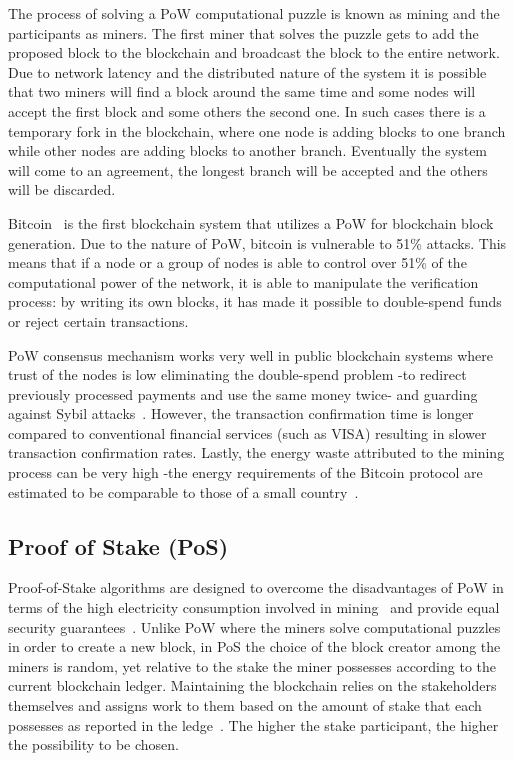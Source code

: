 The process of solving a PoW computational puzzle is known as mining and the participants as miners.
The first miner that solves the puzzle gets to add the proposed block to the blockchain and broadcast
the block to the entire network. Due to network latency and the distributed nature of the system it is possible that two miners will
find a block around the same time and some nodes will accept the first block and some others the second one. In such cases there is a temporary
fork in the blockchain, where one node is adding blocks to one branch while other nodes are adding blocks to another branch. Eventually the
system will come to an agreement, the longest branch will be accepted and the others will be discarded.

Bitcoin~\cite{Zohar:2015:BUH:2817191.2701411} is the first blockchain system that utilizes a PoW for blockchain block generation. Due to the nature of PoW, bitcoin is vulnerable to 51\% attacks.
This means that if a node or a group of nodes is able to control over 51\% of the computational power of the network, it is able to manipulate
the verification process: by writing its own blocks, it has made it possible to double-spend funds or reject certain transactions.

PoW consensus mechanism works very well in public blockchain systems where trust of the nodes is low eliminating
the double-spend problem -to redirect previously processed payments and use the same money twice- and guarding against Sybil attacks~\cite{Vu:2009:PCP:1671222}.
However, the transaction confirmation time is longer compared to conventional financial services (such as VISA)\cite{Sompolinsky2015,Zohar:2015:BUH:2817191.2701411,DBLP:journals/corr/abs-1708-05665} resulting
in slower transaction confirmation rates. Lastly, the energy waste attributed to the mining process can be very high -the energy requirements
of the Bitcoin protocol are estimated to be comparable to those of a small country~\cite{6912770}.

\subsection{Proof of Stake (PoS)}\label{blockchain:consensus:pos}

Proof-of-Stake algorithms are designed to overcome the disadvantages of PoW in terms of the high electricity consumption involved in mining~\cite{bl_consensus}
and provide equal security guarantees~\cite{Kiayias2017}. Unlike PoW where the miners solve computational puzzles in order to create a new block, in PoS the choice
of the block creator among the miners is random, yet relative to the stake the miner possesses according to the current blockchain ledger. Maintaining
the blockchain relies on the stakeholders themselves and assigns work to them based on the amount of stake that each possesses as reported in the ledge~\cite{Kiayias2017}.
The higher the stake participant, the higher the possibility to be chosen.

